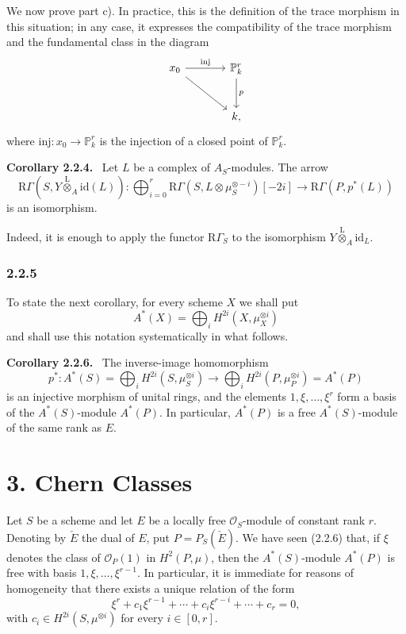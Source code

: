 \documentclass[11pt]{article}
\newenvironment{statement}[1]{\par\medskip\noindent\textbf{#1.}\ }{\par\medskip}
\providecommand{\lten}{\overset{\mathrm L}{\otimes}}
\providecommand{\lten}{\overset{\mathrm L}{\otimes}}
\providecommand{\lten}{\overset{\mathrm L}{\otimes}}
\providecommand{\lten}{\overset{\mathrm L}{\otimes}}
\providecommand{\lten}{\overset{\mathrm L}{\otimes}}
\providecommand{\lten}{\overset{\mathrm L}{\otimes}}
\begin{document}
We now prove part c). In practice, this is the definition of the trace morphism in this situation; in any case, it expresses the compatibility of the trace morphism and the fundamental class in the diagram
\[
\begin{tikzcd}[column sep=large,row sep=large]
x_0 \arrow[r,"\mathrm{inj}"] \arrow[dr] & \mathbb P^r_k \arrow[d,"p"]\\
& k ,
\end{tikzcd}
\]
where $\mathrm{inj}:x_0\to \mathbb P^r_k$ is the injection of a closed point of $\mathbb P^r_k$.

\begin{statement}{Corollary 2.2.4}
Let $L$ be a complex of $A_S$-modules. The arrow
\[
\mathrm R\Gamma(S,Y\lten_A\mathrm{id}(L)):
\bigoplus_{i=0}^r \mathrm R\Gamma(S,L\otimes\mu_S^{\otimes -i})[-2i]
\longrightarrow
\mathrm R\Gamma(P,p^*(L))
\]
is an isomorphism.
\end{statement}

Indeed, it is enough to apply the functor $\mathrm R\Gamma_S$ to the isomorphism $Y\lten_A\mathrm{id}_L$.

\subsubsection*{2.2.5}
To state the next corollary, for every scheme $X$ we shall put
\[
A^*(X)=\bigoplus_i H^{2i}(X,\mu_X^{\otimes i})
\]
and shall use this notation systematically in what follows.

\begin{statement}{Corollary 2.2.6}
The inverse-image homomorphism
\[
p^*:A^*(S)=\bigoplus_i H^{2i}(S,\mu_S^{\otimes i})
\longrightarrow
\bigoplus_i H^{2i}(P,\mu_P^{\otimes i})=A^*(P)
\]
is an injective morphism of unital rings, and the elements $1,\xi,\ldots,\xi^r$ form a basis of the $A^*(S)$-module $A^*(P)$. In particular, $A^*(P)$ is a free $A^*(S)$-module of the same rank as $E$.
\end{statement}

\section*{3. Chern Classes}

Let $S$ be a scheme and let $E$ be a locally free $\mathcal O_S$-module of constant rank $r$. Denoting by $\check E$ the dual of $E$, put $P=P_S(\check E)$. We have seen (2.2.6) that, if $\xi$ denotes the class of $\mathcal O_P(1)$ in $H^2(P,\mu)$, then the $A^*(S)$-module $A^*(P)$ is free with basis $1,\xi,\ldots,\xi^{r-1}$. In particular, it is immediate for reasons of homogeneity that there exists a unique relation of the form
\[
\xi^r+c_1\xi^{r-1}+\cdots+c_i\xi^{r-i}+\cdots+c_r=0,
\tag{3.1}
\]
with $c_i\in H^{2i}(S,\mu^{\otimes i})$ for every $i\in[0,r]$.
\end{document}
